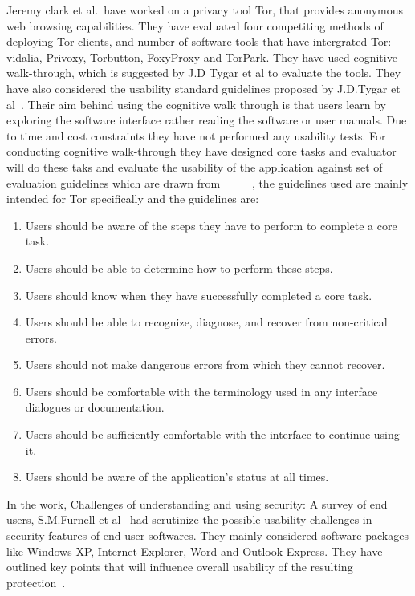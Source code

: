  Jeremy clark et al.~\cite{clark2007usability}have worked on a privacy tool Tor, that provides anonymous web browsing capabilities. They have evaluated four competiting methods of deploying Tor clients, and number of software tools that have intergrated Tor: vidalia, Privoxy, Torbutton, FoxyProxy and TorPark. They have used cognitive walk-through, which is suggested by J.D Tygar et al to evaluate the tools. They have also considered the usability standard guidelines proposed by J.D.Tygar et al~\cite{whitten1999johnny}. Their aim behind using the cognitive walk through is that users learn by exploring the software interface rather reading the software or user manuals. Due to time and cost constraints they have not performed any usability tests. For conducting cognitive walk-through they have designed core tasks and evaluator will do these taks and evaluate the usability of the application against set of evaluation guidelines which are drawn from ~\cite{chiasson2006usability}~\cite{whitten1999johnny}~\cite{karat2005usability}~\cite{reagle1999platform}~\cite{wharton1994cognitive}, the guidelines used are mainly intended for Tor specifically and the guidelines are:~\cite{clark2007usability}
 \begin{enumerate}
 	\item Users should be aware of the steps they have to perform to complete a core task.
 	\item Users should be able to determine how to perform these steps.
 	\item Users should know when they have successfully completed a core task.
 	\item Users should be able to recognize, diagnose, and recover from non-critical errors.
 	\item Users should not make dangerous errors from which they cannot recover.
 	\item Users should be comfortable with the terminology used in any interface dialogues or documentation.
 	\item Users should be sufficiently comfortable with the interface to continue using it.
 	\item Users should be aware of the application's status at all times.~\cite{clark2007usability}
 \end{enumerate}
 In the work, Challenges of understanding and using security: A survey of end users, S.M.Furnell et al~\cite{furnell2006challenges} had scrutinize the possible usability challenges in security features of end-user softwares. They mainly considered software packages like Windows XP, Internet Explorer, Word and Outlook Express. They have outlined key points that will influence overall usability of the resulting protection~\cite{furnell2006challenges}.
